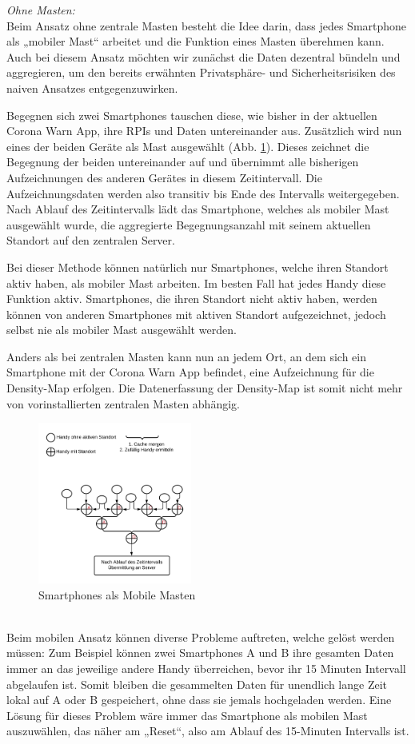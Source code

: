 \documentclass[conference,compsoc]{IEEEtran}
\begin{document}
\textit{Ohne Masten:}\\
Beim Ansatz ohne zentrale Masten besteht die Idee darin, dass jedes Smartphone als „mobiler Mast“ arbeitet und die Funktion eines Masten überehmen kann.
Auch bei diesem Ansatz möchten wir zunächst die Daten dezentral bündeln und aggregieren, um den bereits erwähnten Privatsphäre- und Sicherheitsrisiken des naiven Ansatzes entgegenzuwirken.  

Begegnen sich zwei Smartphones tauschen diese, wie bisher in der aktuellen Corona Warn App, ihre RPIs und Daten untereinander aus. 
Zusätzlich wird nun eines der beiden Geräte als Mast ausgewählt (Abb. \ref{mobile_mast}). 
Dieses zeichnet die Begegnung der beiden untereinander auf und übernimmt alle bisherigen Aufzeichnungen des anderen Gerätes in diesem Zeitintervall.
Die Aufzeichnungsdaten werden also transitiv bis Ende des Intervalls weitergegeben. 
Nach Ablauf des Zeitintervalls lädt das Smartphone, welches als mobiler Mast ausgewählt wurde, die aggregierte Begegnungsanzahl mit seinem aktuellen Standort auf den zentralen Server.

Bei dieser Methode können natürlich nur Smartphones, welche ihren Standort aktiv haben, als mobiler Mast arbeiten. 
Im besten Fall hat jedes Handy diese Funktion aktiv. Smartphones, die ihren Standort nicht aktiv haben, werden können von anderen Smartphones mit aktiven Standort aufgezeichnet, jedoch selbst nie als mobiler Mast ausgewählt werden.

Anders als bei zentralen Masten kann nun an jedem Ort, an dem sich ein Smartphone mit der Corona Warn App befindet, eine Aufzeichnung für die Density-Map erfolgen. 
Die Datenerfassung der Density-Map ist somit nicht mehr von vorinstallierten zentralen Masten abhängig.\\
\begin{figure}[h]
	\centering
	\includegraphics[width=0.45\textwidth]{"Mobile_Mast"}
	\caption{Smartphones als Mobile Masten}
	\label{mobile_mast}
\end{figure} \\
Beim mobilen Ansatz können diverse Probleme auftreten, welche gelöst werden müssen: Zum Beispiel können zwei Smartphones A und B ihre gesamten Daten immer an das jeweilige andere Handy überreichen, bevor ihr 15 Minuten Intervall abgelaufen ist. 
Somit bleiben die gesammelten Daten für unendlich lange Zeit lokal auf A oder B gespeichert, ohne dass sie jemals hochgeladen werden. 
Eine Lösung für dieses Problem wäre immer das Smartphone als mobilen Mast auszuwählen, das näher am „Reset“, also am Ablauf des 15-Minuten Intervalls ist.
\end{document}
